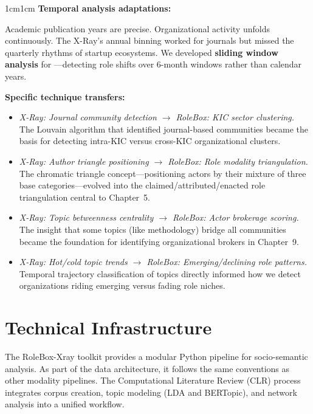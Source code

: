 \documentclass[../main.tex]{subfiles}
\begin{document}
\begin{adjustwidth}{1cm}{1cm}
\noindent\textbf{Temporal analysis adaptations:}

Academic publication years are precise. Organizational activity unfolds continuously. The X-Ray's annual binning worked for journals but missed the quarterly rhythms of startup ecosystems. We developed \textbf{sliding window analysis} for \RoleBox---detecting role shifts over 6-month windows rather than calendar years.

\vspace{0.5cm}

\noindent\textbf{Specific technique transfers:}

\begin{itemize}[leftmargin=2em, itemsep=0.2em]
    \item \textit{X-Ray: Journal community detection $\rightarrow$ RoleBox: KIC sector clustering.} The Louvain algorithm that identified journal-based communities became the basis for detecting intra-KIC versus cross-KIC organizational clusters.

    \item \textit{X-Ray: Author triangle positioning $\rightarrow$ RoleBox: Role modality triangulation.} The chromatic triangle concept---positioning actors by their mixture of three base categories---evolved into the claimed/attributed/enacted role triangulation central to Chapter~5.

    \item \textit{X-Ray: Topic betweenness centrality $\rightarrow$ RoleBox: Actor brokerage scoring.} The insight that some topics (like methodology) bridge all communities became the foundation for identifying organizational brokers in Chapter~9.

    \item \textit{X-Ray: Hot/cold topic trends $\rightarrow$ RoleBox: Emerging/declining role patterns.} Temporal trajectory classification of topics directly informed how we detect organizations riding emerging versus fading role niches.
\end{itemize}

\vspace{0.8cm}

\section*{Technical Infrastructure}

The RoleBox-Xray toolkit provides a modular Python pipeline for socio-semantic analysis. As part of the \RoleBox{} data architecture, it follows the same conventions as other modality pipelines. The Computational Literature Review (CLR) process integrates corpus creation, topic modeling (LDA and BERTopic), and network analysis into a unified workflow.

\end{adjustwidth}
\end{document}
